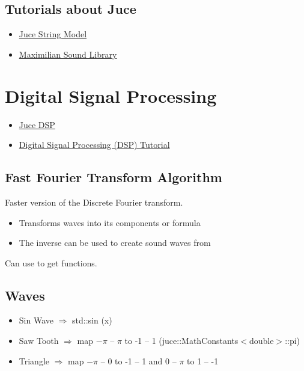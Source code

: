 \documentclass{article}
\begin{document}
	 
	 \subsection{Tutorials about Juce}
	 \begin{itemize}
	 	\item \href{https://docs.juce.com/master/tutorial_dsp_delay_line.html}{Juce String Model}
	 	\item \href{https://github.com/micknoise/Maximilian}{Maximilian Sound Library}
	 \end{itemize}

\section{Digital Signal Processing}
	\begin{itemize}
		\item \href{https://docs.juce.com/master/tutorial_dsp_introduction.html}{Juce DSP}
		\item \href{https://www.youtube.com/watch?v=HJ_-5mqUZ70}{Digital Signal Processing (DSP) Tutorial}
	\end{itemize}
	
	\subsection{Fast Fourier Transform Algorithm}
	Faster version of the Discrete Fourier transform.
	\begin{itemize}
		\item Transforms waves into its components or formula
		\item The inverse can be used to create sound waves from 
	\end{itemize}

	Can use to get functions.


	
	\subsection{Waves}
	\begin{itemize}
		\item Sin Wave $\Rightarrow$ std::sin (x)
		\item Saw Tooth $\Rightarrow$ map $-\pi$ -- $\pi$ to -1 -- 1 (juce::MathConstants$<$double$>$::pi)
		\item Triangle $\Rightarrow$ map $-\pi$ -- 0 to -1 -- 1 and 0 -- $\pi$ to 1 -- -1
	\end{itemize}
	
\end{document}
